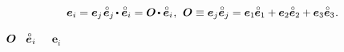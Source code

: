 \nopagebreak\vspace{-0.2em}\begin{equation}\label{introductionofrotationtensor}
\bm{e}_i = \bm{e}_j \hspace{.2ex} \tikzmark{beginEqualsKroneckerDelta} \mathcircabove{\bm{e}}_j \hspace{-0.2ex} \dotp \mathcircabove{\bm{e}}_i \tikzmark{endEqualsKroneckerDelta} = \rotationtensor \hspace{-0.2ex} \dotp \mathcircabove{\bm{e}}_i \hspace{.1ex}, \:\,
\rotationtensor \equiv \bm{e}_j \mathcircabove{\bm{e}}_j = \scalebox{.96}[1]{$ \bm{e}_1 \hspace{-0.1ex} \mathcircabove{\bm{e}}_1 + \bm{e}_2 \mathcircabove{\bm{e}}_2 + \bm{e}_3 \mathcircabove{\bm{e}}_3 $}
\hspace{.1ex} .
\end{equation}

~$\bm{O}$ ~${\mathcircabove{\bm{e}}_i}$\ru{,} ~~${\bm{e}_i}$  

